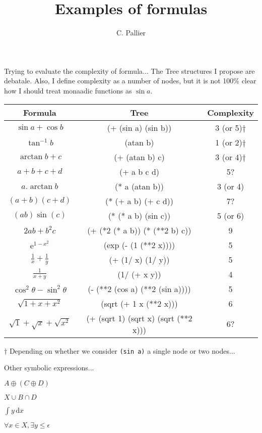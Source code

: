 \documentclass{article}
\begin{document}
\title{Examples of formulas}
\author{C. Pallier}
\maketitle

Trying to evaluate the complexity of formula... 
The Tree structures I propose are debatale. Also, I define complexity as a number of nodes, but it is not 100\% clear how I should treat monaadic functions as $\sin a$.

\setlength{\tabcolsep}{18pt}

\begin{tabular}{ccc}
Formula             & Tree                         & Complexity \\ \hline

$ \sin a + \cos b $ & (+ (sin a) (sin b))     & 3 (or 5)$\dag$ \\

$\tan^{-1} b$       & (atan b)                & 1 (or 2)$\dag$\\

$\arctan b + c$     & (+ (atan b) c)          & 3 (or 4)$\dag$\\

$a + b + c + d$     & (+ a b c d)         & 5? \\

$ a . \arctan b $   & (* a (atan b))      & 3 (or 4)\\

$ (a+b)(c+d) $      & (* (+ a b) (+ c d))  & 7? \\

$ (ab)\sin(c) $     & (* (* a b) (sin c)) & 5 (or 6)\\

$ 2ab + b^2 c $     & (+ (*2 (* a b)) (* (**2 b) c)) & 9\\

$ \mathrm{e}^{1-x^2} $ & (exp (- (1 (**2 x)))) & 5\\

$ \frac{1}{x}+\frac{1}{y} $ & (+ (1/ x) (1/ y)) & 5\\

$ \frac{1}{x+y} $ & (1/ (+ x y)) & 4\\

$ \cos^2 \theta - \sin^2 \theta $ & (- (**2 (cos a) (**2 (sin a)))) & 5 \\ 

$ \sqrt{1+x+x^2} $ & (sqrt (+ 1 x (**2 x))) &  6 \\

$ \sqrt{1}+\sqrt{x}+\sqrt{x^2}$ & (+ (sqrt 1) (sqrt x) (sqrt (**2 x))) & 6?\\
\hline

\end{tabular}
$\dag$ Depending on whether we consider \texttt{(sin a)} a single node or two nodes...


Other symbolic expressions...


$ A \oplus (C \oplus D) $

$ X \cup B \cap D $

$ \int y\, \mathrm{d}x$

$ \forall x \in X, \exists y \leq \epsilon$
\end{document}
